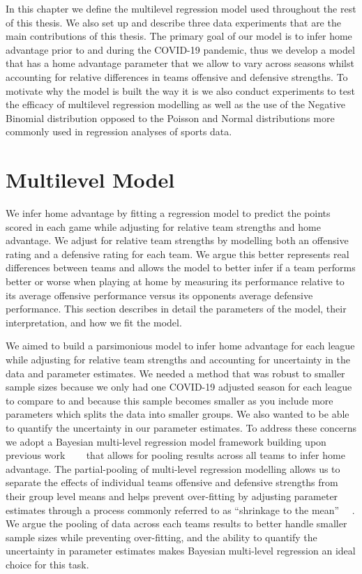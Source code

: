 In this chapter we define the multilevel regression model used throughout the rest of this thesis. We also set up and describe three data experiments that are the main contributions of this thesis. The primary goal of our model is to infer home advantage prior to and during the COVID-19 pandemic, thus we develop a model that has a home advantage parameter that we allow to vary across seasons whilst accounting for relative differences in teams offensive and defensive strengths. To motivate why the model is built the way it is we also conduct experiments to test the efficacy of multilevel regression modelling as well as the use of the Negative Binomial distribution opposed to the Poisson and Normal distributions more commonly used in regression analyses of sports data.

\section{Multilevel Model} \label{multilevel_model}

We infer home advantage by fitting a regression model to predict the points scored in each game while adjusting for relative team strengths and home advantage. We adjust for relative team strengths by modelling both an offensive rating and a defensive rating for each team. We argue this better represents real differences between teams and allows the model to better infer if a team performs better or worse when playing at home by measuring its performance relative to its average offensive performance versus its opponents average defensive performance. This section describes in detail the parameters of the model, their interpretation, and how we fit the model.

We aimed to build a parsimonious model to infer home advantage for each league while adjusting for relative team strengths and accounting for uncertainty in the data and parameter estimates. We needed a method that was robust to smaller sample sizes because we only had one COVID-19 adjusted season for each league to compare to and because this sample becomes smaller as you include more parameters which splits the data into smaller groups. We also wanted to be able to quantify the uncertainty in our parameter estimates. To address these concerns we adopt a Bayesian multi-level regression model framework building upon previous work \mbox{\cite{Baio2010} \cite{Glickman1998} \cite{Lopez2018} \cite{Benz2020}} that allows for pooling results across all teams to infer home advantage. The partial-pooling of multi-level regression modelling allows us to separate the effects of individual teams offensive and defensive strengths from their group level means and helps prevent over-fitting by adjusting parameter estimates through a process commonly referred to as ``shrinkage to the mean'' \mbox{\cite{Gelman2014} \cite{Gelman2006} \cite{McElreath2020}}. We argue the pooling of data across each teams results to better handle smaller sample sizes while preventing over-fitting, and the ability to quantify the uncertainty in parameter estimates makes Bayesian multi-level regression an ideal choice for this task.

